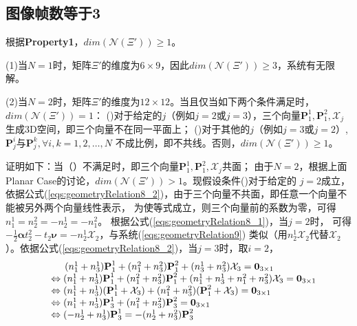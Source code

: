\documentclass{article}
\begin{document}
\subsection{图像帧数等于3}
根据\textbf{Property1}，$dim(\mathcal{N}(\Xi'))\geqslant 1$。
\par
(1)当$N=1$时，矩阵$\Xi'$的维度为$6\times 9$，因此$dim(\mathcal{N}(\Xi'))\geqslant 3$，系统有无限解。
\par
(2)当$N=2$时，矩阵$\Xi'$的维度为$12\times 12$。当且仅当如下两个条件满足时，$dim(\mathcal{N}(\Xi'))=1$：
()对于给定的$j$（例如$j=2$或$j=3$），三个向量$\textbf{P}_1^1,\textbf{P}_1^2,\mathcal{X}_j$
生成3D空间，即三个向量不在同一平面上；
()对于其他的$j$（例如$j=3$或$j=2$）,$\textbf{P}_j^i$与$\textbf{P}_j^k,\forall i,k=1,2,\dots,N$
不成比例，即不共线。否则，$dim(\mathcal{N}(\Xi'))\geqslant 1$。
\par
证明如下：当（）不满足时，即三个向量$\textbf{P}_1^1,\textbf{P}_1^2,\mathcal{X}_j$共面；
由于$N=2$，根据上面Planar Case的讨论，$dim(\mathcal{N}(\Xi'))>1$。现假设条件()对于给定的
$j=2$成立，依据公式(\ref{eqs:geometryRelation8_2})，由于三个向量不共面，即任意一个向量不能被另外两个向量线性表示，
为使等式成立，则三个向量前的系数为零，可得$n_1^1=n_2^2=-n_2^1=-n_1^2$。
根据公式(\ref{eqs:geometryRelation8_1})，当$j=2$时，
可得$-\frac{1}{2}\mathbf{\alpha}t_2^2-t_2\mathbf{\nu}=-n_2^1\mathcal{X}_2$，与系统(\ref{eqs:geometryRelation9})
类似（用$n_2^1\mathcal{X}_2$代替$\mathcal{X}_2$）。依据公式(\ref{eqs:geometryRelation8_2})，当$j=3$时，取$i=2$，
\begin{equation}
    \begin{array}{ll}
        &\hspace{0.5cm}(n_1^1+n_3^1)\textbf{P}_1^1+(n_1^2+n_3^2)\textbf{P}_1^2+(n_3^1+n_3^2)\mathcal{X}_3=\textbf{0}_{3\times 1}\\
        &\Leftrightarrow
        (n_1^1+n_3^1)\textbf{P}_1^1+(n_1^2+n_3^2)\textbf{P}_1^2+(n_1^1+n_3^1+n_1^2+n_3^2)\mathcal{X}_3=\textbf{0}_{3\times 1}\\
        &\Leftrightarrow
        (n_1^1+n_3^1)(\textbf{P}_1^1+\mathcal{X}_3)+(n_1^2+n_3^2)(\textbf{P}_1^2+\mathcal{X}_3)=\textbf{0}_{3\times 1}\\
        &\Leftrightarrow
        (n_1^1+n_3^1)\textbf{P}_3^1+(n_1^2+n_3^2)\textbf{P}_3^2=\textbf{0}_{3\times 1}\\
        &\Leftrightarrow
        (-n_2^1+n_3^1)\textbf{P}_3^1=-(n_2^1+n_3^2)\textbf{P}_3^2
    \end{array}
\end{equation}
\end{document}

